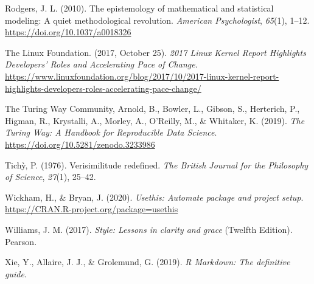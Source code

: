 \documentclass[12pt,a4paper,]{article}
\begin{document}
\leavevmode\hypertarget{ref-rodgersEpistemologyMathematicalStatistical2010}{}%
Rodgers, J. L. (2010). The epistemology of mathematical and statistical modeling: A quiet methodological revolution. \emph{American Psychologist}, \emph{65}(1), 1--12. \url{https://doi.org/10.1037/a0018326}

\leavevmode\hypertarget{ref-thelinuxfoundation2017LinuxKernel2017}{}%
The Linux Foundation. (2017, October 25). \emph{2017 Linux Kernel Report Highlights Developers' Roles and Accelerating Pace of Change}. \url{https://www.linuxfoundation.org/blog/2017/10/2017-linux-kernel-report-highlights-developers-roles-accelerating-pace-change/}

\leavevmode\hypertarget{ref-theturingwaycommunityTuringWayHandbook2019}{}%
The Turing Way Community, Arnold, B., Bowler, L., Gibson, S., Herterich, P., Higman, R., Krystalli, A., Morley, A., O'Reilly, M., \& Whitaker, K. (2019). \emph{The Turing Way: A Handbook for Reproducible Data Science}. \url{https://doi.org/10.5281/zenodo.3233986}

\leavevmode\hypertarget{ref-tichyVerisimilitudeRedefined1976}{}%
Tichỳ, P. (1976). Verisimilitude redefined. \emph{The British Journal for the Philosophy of Science}, \emph{27}(1), 25--42.

\leavevmode\hypertarget{ref-R-usethis}{}%
Wickham, H., \& Bryan, J. (2020). \emph{Usethis: Automate package and project setup}. \url{https://CRAN.R-project.org/package=usethis}

\leavevmode\hypertarget{ref-williamsStyleLessonsClarity2017}{}%
Williams, J. M. (2017). \emph{Style: Lessons in clarity and grace} (Twelfth Edition). Pearson.

\leavevmode\hypertarget{ref-xieMarkdownDefinitiveGuide2019}{}%
Xie, Y., Allaire, J. J., \& Grolemund, G. (2019). \emph{R Markdown: The definitive guide}.
\end{document}
